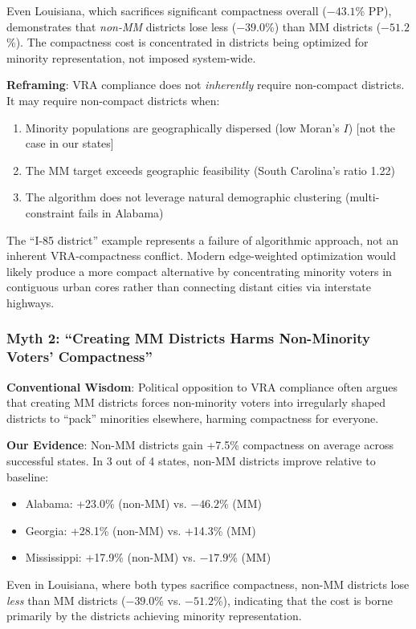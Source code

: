 Even Louisiana, which sacrifices significant compactness overall ($-43.1$\% PP), demonstrates that \emph{non-MM} districts lose less ($-39.0$\%) than MM districts ($-51.2$\%). The compactness cost is concentrated in districts being optimized for minority representation, not imposed system-wide.

\textbf{Reframing}: VRA compliance does not \emph{inherently} require non-compact districts. It may require non-compact districts when:
\begin{enumerate}
    \item Minority populations are geographically dispersed (low Moran's $I$) [not the case in our states]
    \item The MM target exceeds geographic feasibility (South Carolina's ratio 1.22)
    \item The algorithm does not leverage natural demographic clustering (multi-constraint fails in Alabama)
\end{enumerate}

The ``I-85 district'' example represents a failure of algorithmic approach, not an inherent VRA-compactness conflict. Modern edge-weighted optimization would likely produce a more compact alternative by concentrating minority voters in contiguous urban cores rather than connecting distant cities via interstate highways.

\subsubsection{Myth 2: ``Creating MM Districts Harms Non-Minority Voters' Compactness''}

\textbf{Conventional Wisdom}: Political opposition to VRA compliance often argues that creating MM districts forces non-minority voters into irregularly shaped districts to ``pack'' minorities elsewhere, harming compactness for everyone.

\textbf{Our Evidence}: Non-MM districts gain +7.5\% compactness on average across successful states. In 3 out of 4 states, non-MM districts improve relative to baseline:
\begin{itemize}
    \item Alabama: +23.0\% (non-MM) vs. $-46.2$\% (MM)
    \item Georgia: +28.1\% (non-MM) vs. +14.3\% (MM)
    \item Mississippi: +17.9\% (non-MM) vs. $-17.9$\% (MM)
\end{itemize}

Even in Louisiana, where both types sacrifice compactness, non-MM districts lose \emph{less} than MM districts ($-39.0$\% vs. $-51.2$\%), indicating that the cost is borne primarily by the districts achieving minority representation.

